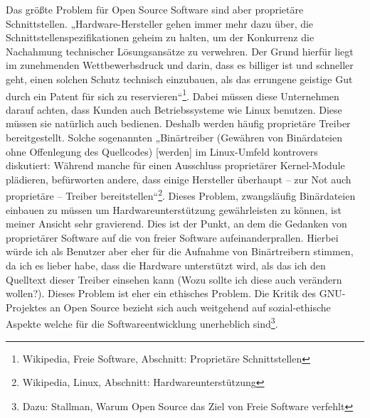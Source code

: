 \documentclass[a4paper,12pt]{article}
\begin{document}
Das größte Problem für Open Source Software sind aber proprietäre Schnittstellen. „Hardware-Hersteller gehen immer mehr dazu über, die Schnittstellenspezifikationen geheim zu halten, um der Konkurrenz die Nachahmung technischer Lösungsansätze zu verwehren. Der Grund hierfür liegt im zunehmenden Wettbewerbsdruck und darin, dass es billiger ist und schneller geht, einen solchen Schutz technisch einzubauen, als das errungene geistige Gut durch ein Patent für sich zu reservieren“\footnote{Wikipedia, Freie Software, Abschnitt: Proprietäre Schnittstellen}. Dabei müssen diese Unternehmen darauf achten, dass Kunden auch Betriebssysteme wie Linux benutzen. Diese müssen sie natürlich auch bedienen. Deshalb werden häufig proprietäre Treiber bereitgestellt. Solche sogenannten „Binärtreiber (Gewähren von Binärdateien ohne Offenlegung des Quellcodes) [werden] im Linux-Umfeld kontrovers diskutiert: Während manche für einen Ausschluss proprietärer Kernel-Module plädieren, befürworten andere, dass einige Hersteller überhaupt – zur Not auch proprietäre – Treiber bereitstellen“\footnote{Wikipedia, Linux, Abschnitt: Hardwareunterstützung}. Dieses Problem, zwangsläufig Binärdateien einbauen zu müssen um Hardwareunterstützung gewährleisten zu können, ist meiner Ansicht sehr gravierend. Dies ist der Punkt, an dem die Gedanken von proprietärer Software auf die von freier Software aufeinanderprallen. Hierbei würde ich als Benutzer aber eher für die Aufnahme von Binärtreibern stimmen, da ich es lieber habe, dass die Hardware unterstützt wird, als das ich den Quelltext dieser Treiber einsehen kann (Wozu sollte ich diese auch verändern wollen?). Dieses Problem ist eher ein ethisches Problem. Die Kritik des GNU-Projektes an Open Source bezieht sich auch weitgehend auf sozial-ethische Aspekte welche für die Softwareentwicklung unerheblich sind\footnote{Dazu: Stallman, Warum Open Source das Ziel von Freie Software verfehlt}.\\
\end{document}
